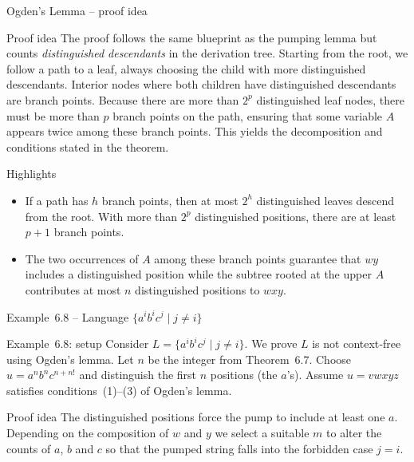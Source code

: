 \begin{frame}[t]{Ogden’s Lemma – proof idea}
  \begin{tblock}{Proof idea}
    The proof follows the same blueprint as the pumping lemma but
    counts \emph{distinguished descendants} in the derivation tree.
    Starting from the root, we follow a path to a leaf, always choosing
    the child with more distinguished descendants.  Interior nodes where
    both children have distinguished descendants are branch points.
    Because there are more than $2^p$ distinguished leaf nodes, there
    must be more than $p$ branch points on the path, ensuring that some
    variable $A$ appears twice among these branch points.  This yields
    the decomposition and conditions stated in the theorem.
  \end{tblock}
  \begin{tblock}{Highlights}
    \begin{itemize}
      \item If a path has $h$ branch points, then at most $2^h$
        distinguished leaves descend from the root.  With more than
        $2^p$ distinguished positions, there are at least $p+1$ branch
        points.
      \item The two occurrences of $A$ among these branch points
        guarantee that $w y$ includes a distinguished position while the
        subtree rooted at the upper $A$ contributes at most $n$
        distinguished positions to $w x y$.
    \end{itemize}
  \end{tblock}
  \label{fr:6.1-23}
\end{frame}

\begin{frame}[t]{Example 6.8 – Language $\{a^i b^i c^j \mid j \ne i\}$}
  \begin{texample}{Example 6.8: setup}
    Consider $L = \{ a^i b^i c^j \mid j \ne i \}$.  We prove $L$ is not
    context‑free using Ogden’s lemma.  Let $n$ be the integer from
    Theorem 6.7.  Choose $u = a^n b^n c^{n + n!}$ and distinguish the
    first $n$ positions (the $a$’s).  Assume $u = v w x y z$ satisfies
    conditions (1)–(3) of Ogden’s lemma.
  \end{texample}
  \begin{tblock}{Proof idea}
    The distinguished positions force the pump to include at least one
    $a$.  Depending on the composition of $w$ and $y$ we select a
    suitable $m$ to alter the counts of $a$, $b$ and $c$ so that the
    pumped string falls into the forbidden case $j = i$.
  \end{tblock}
  \label{fr:6.1-24}
\end{frame}

